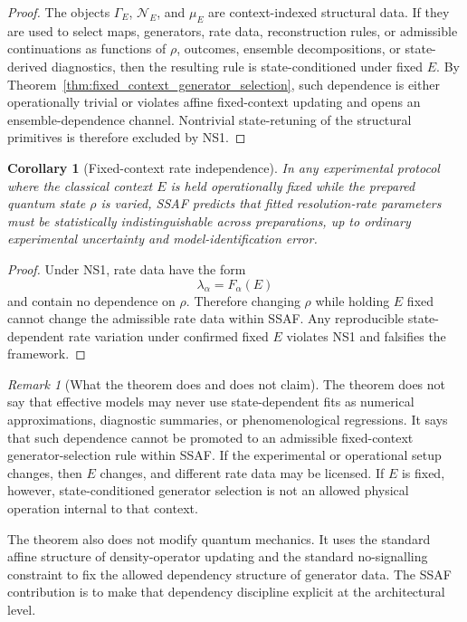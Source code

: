 \documentclass[aps,prx,onecolumn,11pt]{revtex4-2}
\theoremstyle{plain}
\newtheorem{corollary}{Corollary}
\theoremstyle{definition}
\theoremstyle{remark}
\newtheorem{remark}{Remark}
\begin{document}
\begin{proof}
The objects \(\Gamma_E\), \(\mathcal N_E\), and \(\mu_E\) are
context-indexed structural data. If they are used to select maps,
generators, rate data, reconstruction rules, or admissible
continuations as functions of \(\rho\), outcomes, ensemble
decompositions, or state-derived diagnostics, then the resulting rule is
state-conditioned under fixed \(E\). By
Theorem~\ref{thm:fixed_context_generator_selection}, such dependence is
either operationally trivial or violates affine fixed-context updating
and opens an ensemble-dependence channel. Nontrivial state-retuning of
the structural primitives is therefore excluded by NS1.
\end{proof}

\begin{corollary}[Fixed-context rate independence]
\label{cor:fixed_context_rate_independence}
In any experimental protocol where the classical context \(E\) is held
operationally fixed while the prepared quantum state \(\rho\) is varied,
SSAF predicts that fitted resolution-rate parameters must be
statistically indistinguishable across preparations, up to ordinary
experimental uncertainty and model-identification error.
\end{corollary}

\begin{proof}
Under NS1, rate data have the form
\[
\lambda_\alpha=F_\alpha(E)
\]
and contain no dependence on \(\rho\). Therefore changing \(\rho\) while
holding \(E\) fixed cannot change the admissible rate data within SSAF.
Any reproducible state-dependent rate variation under confirmed fixed
\(E\) violates NS1 and falsifies the framework.
\end{proof}

\begin{remark}[What the theorem does and does not claim]
The theorem does not say that effective models may never use
state-dependent fits as numerical approximations, diagnostic summaries,
or phenomenological regressions. It says that such dependence cannot be
promoted to an admissible fixed-context generator-selection rule within
SSAF. If the experimental or operational setup changes, then \(E\)
changes, and different rate data may be licensed. If \(E\) is fixed,
however, state-conditioned generator selection is not an allowed
physical operation internal to that context.

The theorem also does not modify quantum mechanics. It uses the
standard affine structure of density-operator updating and the standard
no-signalling constraint to fix the allowed dependency structure of
generator data. The SSAF contribution is to make that dependency
discipline explicit at the architectural level.
\end{remark}
\end{document}
